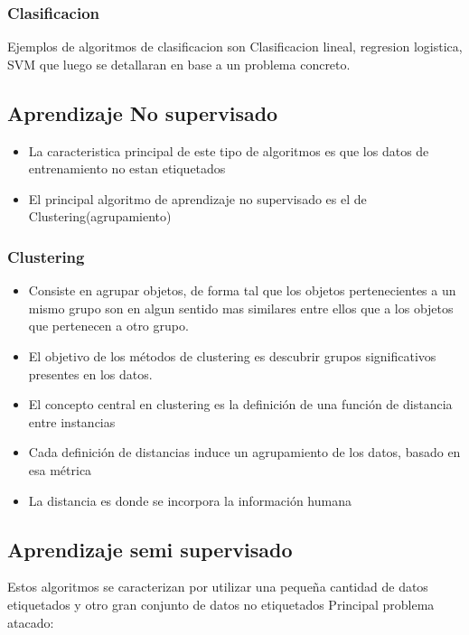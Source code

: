 \documentclass[a4paper,11pt,spanish]{book}
\begin{document}
      \subsubsection{Clasificacion}

      Ejemplos de algoritmos de clasificacion son Clasificacion lineal, regresion logistica, SVM que luego se detallaran en base a un problema concreto.
  
    \subsection{Aprendizaje No supervisado} 
      \begin{itemize}
	\item La caracteristica principal de este tipo de algoritmos es que los datos de entrenamiento no estan etiquetados
	\item El principal algoritmo de aprendizaje no supervisado es el de Clustering(agrupamiento)
      \end{itemize}
      \subsubsection {Clustering}
	\begin{itemize}
	  \item Consiste en agrupar objetos, de forma tal que los objetos pertenecientes a un mismo grupo son en algun sentido mas similares entre ellos que a los objetos que pertenecen a otro grupo.
	  \item El objetivo de los métodos de clustering es descubrir grupos significativos presentes en los datos.
	  \item El concepto central en clustering es la definición de una función de distancia entre instancias
	  \item Cada definición de distancias induce un agrupamiento de los datos, basado en esa métrica
	  \item La distancia es donde se incorpora la información humana
	\end{itemize}

    \subsection{Aprendizaje semi supervisado}

      Estos algoritmos se caracterizan por utilizar una pequeña cantidad de datos etiquetados y otro gran conjunto de datos no etiquetados
      Principal problema atacado:
\end{document}
